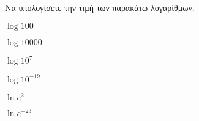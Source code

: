 Να υπολογίσετε την τιμή των παρακάτω λογαρίθμων.
\begin{multicols}{3}
\begin{rlist}[leftmargin=5mm]
\item $ \log{100} $
\item $ \log{10000} $
\item $ \log{10^7} $
\item $ \log{10^{-19}} $
\item $ \ln{e^2} $
\item $ \ln{e^{-23}} $
\end{rlist}
\end{multicols}
